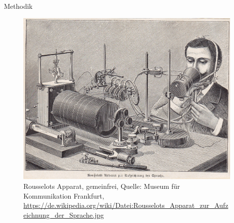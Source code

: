 \begin{frame}{Methodik}

	\begin{figure}
		\centering
		
		\includegraphics[scale=0.1]{material/04RousselotsApparatzurAufzeichnungderSprache}
		\caption{Rousselots Apparat, gemeinfrei, Quelle: Museum für Kommunikation Frankfurt, \url{https://de.wikipedia.org/wiki/Datei:Rousselots_Apparat_zur_Aufzeichnung_der_Sprache.jpg}}
	\end{figure}
	
\end{frame}




		
	

